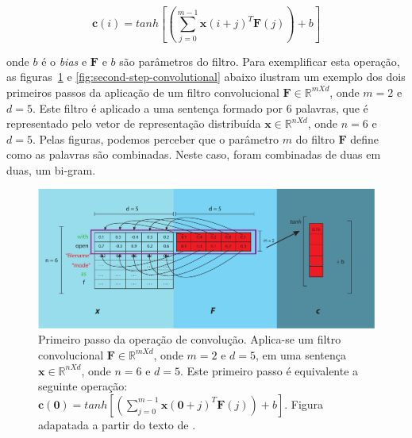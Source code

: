 \begin{equation}\label{eq:calc_convolution_ci}
    \bm{c}(i) = tanh \left[\left(\sum_{j=0}^{m - 1} \bm{x}(i + j)^{T}\bm{F}(j)\right) + b\right]
\end{equation}

onde $b$ é o \textit{bias} e $\bm{F}$ e $b$ são parâmetros do filtro. Para exemplificar esta operação, as figuras~\ref{fig:first-step-convolutional} e \ref{fig:second-step-convolutional} abaixo ilustram um exemplo dos dois primeiros passos da aplicação de um filtro convolucional $\bm{F} \in \mathbb{R}^{m X d}$, onde $m = 2$ e $d = 5$. Este filtro é aplicado a uma sentença formado por 6 palavras, que é representado pelo vetor de representação distribuída $\bm{x} \in \mathbb{R}^{n X d}$, onde $n = 6$ e $d = 5$. Pelas figuras, podemos perceber que o parâmetro $m$ do filtro $\bm{F}$ define como as palavras são combinadas. Neste caso, foram combinadas de duas em duas, um bi-gram.

\begin{figure}[h]
    \centering
    \includegraphics[width=1\textwidth]{figuras/cap-problema/first-step-convolution.pdf}
    \caption{Primeiro passo da operação de convolução. Aplica-se um filtro convolucional $\bm{F} \in \mathbb{R}^{m X d}$, onde $m = 2$ e $d = 5$, em uma sentença $\bm{x} \in \mathbb{R}^{n X d}$, onde $n = 6$ e $d = 5$. Este primeiro passo é equivalente a seguinte operação: $\bm{c}(\bm{0}) = tanh \left[\left(\sum_{j=0}^{m - 1} \bm{x}(\bm{0} + j)^{T}\bm{F}(j)\right) + b\right]$. Figura adapatada a partir do texto de \cite{joshua-kim-cnn-understanding-word-embeddings-2019}.} 
    \label{fig:first-step-convolutional}
\end{figure}

